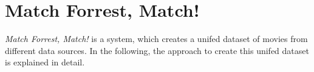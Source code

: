 \section{Match Forrest, Match!}
\label{sec_method}

\emph{Match Forrest, Match!} is a system, which creates a unifed dataset of movies from different data sources.
In the following, the approach to create this unifed dataset is explained in detail.






